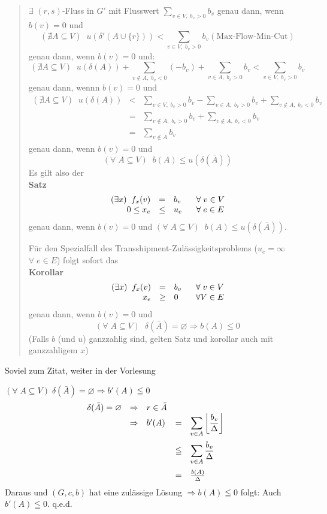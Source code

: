 \begin{quote}
$\exists$ $(r,s)$-Fluss in $G'$ mit Flusswert $\displaystyle \sum_{v \in
V,\; 
b_{v} > 0} b_v$ genau dann, wenn $b(v) = 0$ und 
\[(\nexists A \subseteq V) \; \; u(\delta'(A \cup \{r\})) < \sum_{v \in V, \;
b_v > 0} b_v (\mbox{Max-Flow-Min-Cut})\]
genau dann, wenn $b(v) = 0$ und:
\[ (\nexists A \subseteq V) \; \; u(\delta(A)) + \sum_{v \not\in A, \; b_v
< 0}(-b_v) + \sum_{v \in A, \; b_v >0} b_v <  \sum_{v \in V, \; b_v > 0}
b_v\]
genau dann, wennn $b(v)=0$ und
\[\begin{array}{rcl}
 (\nexists A \subseteq V) \; \; u(\delta(A)) &< &\displaystyle \sum_{v \in V, \; b_v > 0}
b_v - \sum_{v \in A, \; b_v >0} b_v +  \sum_{v \not\in A, \; b_v
< 0} b_v\\
&=& \displaystyle  \sum_{v \not\in A, \; b_v > 0} b_v +  \sum_{v \not\in A,
\; b_v < 0} b_v\\
&=& \displaystyle \sum_{v \not\in A} b_v
\end{array}\]
genau dann, wenn $b(v)=0$ und 
\[(\forall \; A \subseteq V) \; \; b(A) \leq u(\delta(\bar{A}))\]
Es gilt also der\\
{\bf Satz}
\[\begin{array}{rcl@{\hspace{6mm}}l}
(\exists x) \; \; f_x(v) &=& b_v&\forall \; v \in V\\
0\leq x_e &\leq&u_e&\forall \; e \in E
\end{array}\]
genau dann, wenn $b(v) = 0$ und $(\forall \; A \subseteq V) \; \; b(A) \leq
u(\delta(\bar{A}))$.

Für den Spezialfall des Transshipment-Zulässigkeitsproblems ($u_e=\infty$
$\forall \; e \in E$) folgt sofort das\\
{\bf Korollar}
\[\begin{array}{rcl@{\hspace{6mm}}l}
(\exists x) \; \; f_x(v) &=& b_v&\forall \; v \in V\\
x_e &\geq&0&\forall V \in E
\end{array}\]
genau dann, wenn $b(v) = 0$ und
\[(\forall \; A \subseteq V) \; \; \delta(\bar{A}) = \varnothing
\Rightarrow b(A) \leq 0\]
(Falls $b$ (und $u$) ganzzahlig sind, gelten Satz und korollar auch mit
ganzzahligem $x$)
\end{quote}

Soviel zum Zitat, weiter in der Vorlesung

$(\forall\; A \subseteq V)\;  \delta(\bar{A}) = \varnothing \Rightarrow
b'(A) \leqq 0$\\
\[\begin{array}{rclcl}
\delta(\bar{A}) = \varnothing &\Rightarrow& r \in \bar{A}\\
&\Rightarrow& b'(A) &=& \displaystyle \sum_{v \in A} \left\lfloor
\frac{b_{v}}{\Delta}\right\rfloor\vspace{2mm}\\
&&&\leqq& \displaystyle \sum_{v \in A} \frac{b_{v}}{\Delta}\vspace{2mm}\\
&&&=&\frac{b(A)}{\Delta}
\end{array}
\]
Daraus und $(G,c,b)$ hat eine zulässige Lösung $\Rightarrow b(A) \leqq 0$
folgt: Auch $b'(A) \leqq 0$. q.e.d.

